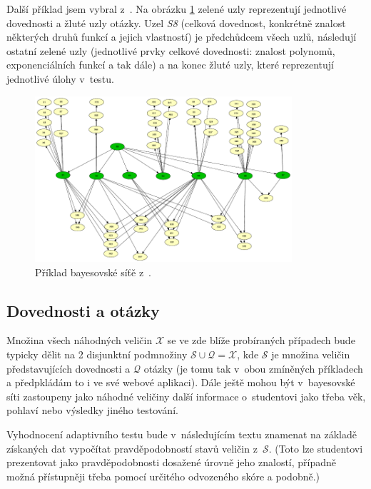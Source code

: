 \documentclass[a4paper,twoside,12pt]{scrbook}
\begin{document}
Další příklad jsem vybral z~\cite{plajner16}. Na obrázku \ref{fig:complex_BN_plajner16} zelené uzly reprezentují jednotlivé dovednosti a žluté uzly otázky. Uzel \emph{S8} (celková dovednost, konkrétně znalost některých druhů funkcí a jejich vlastností) je předchůdcem všech uzlů, následují ostatní zelené uzly (jednotlivé prvky celkové dovednosti: znalost polynomů, exponenciálních funkcí a tak dále) a na konec žluté uzly, které reprezentují jednotlivé úlohy v~testu.

\begin{figure}
  \centering
    \includegraphics[width=0.85\textwidth]{complex_BN_plajner16.pdf}
  \caption{Příklad bayesovské síťě z~\cite{plajner16}.}
  \label{fig:complex_BN_plajner16}
\end{figure}

\subsection{Dovednosti a otázky}
Množina všech náhodných veličin $\mathcal{X}$ se ve zde blíže probíraných případech bude typicky dělit na 2 disjunktní podmnožiny $\mathcal{S} \cup \mathcal{Q} = \mathcal{X}$, kde $\mathcal{S}$ je množina veličin představujících dovednosti a $\mathcal{Q}$ otázky (je tomu tak v~obou zmíněných příkladech a předpkládám to i ve své webové aplikaci). Dále ještě mohou být v~bayesovské síti zastoupeny jako náhodné veličiny další informace o~studentovi jako třeba věk, pohlaví nebo výsledky jiného testování.

Vyhodnocení adaptivního testu bude v~následujícím textu znamenat na základě získaných dat vypočítat pravděpodobností stavů veličin z~$\mathcal{S}$. (Toto lze studentovi prezentovat jako pravděpodobnosti dosažené úrovně jeho znalostí, případně možná přístupněji třeba pomocí určitého odvozeného skóre a podobně.)
\end{document}

